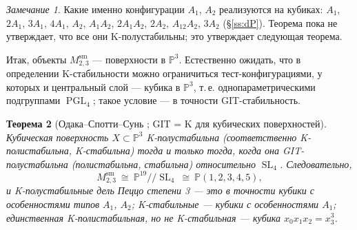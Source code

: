 \documentclass[11pt,a4paper]{article}
\theoremstyle{plain}
\newtheorem{theorem}{Теорема}[section]
\theoremstyle{definition}
\theoremstyle{remark}
\newtheorem{remark}[theorem]{Замечание}
\newcommand{\PP}{\mathbb{P}}
\DeclareMathOperator{\SL}{SL}
\DeclareMathOperator{\PGL}{PGL}
\newcommand{\sm}{\mathrm{sm}}
\begin{document}
\begin{remark}
Какие именно конфигурации $A_1$, $A_2$ реализуются на кубиках: $A_1$, $2A_1$, $3A_1$, $4A_1$,
$A_2$, $A_1A_2$, $2A_1A_2$, $2A_2$, $A_12A_2$, $3A_2$ (\S\ref{ss:dP}). Теорема пока не утверждает, что
все они K-полустабильны; это утверждает следующая теорема.
\end{remark}

Итак, объекты $M^{\sm}_{2,3}$ --- поверхности в $\PP^3$. Естественно ожидать, что в определении
K-стабильности можно ограничиться тест-конфигурациями, у которых и центральный слой --- кубика в
$\PP^3$, т.\,е. однопараметрическими подгруппами $\PGL_4$; такое условие --- в точности GIT-стабильность.

\begin{theorem}[{Одака--Спотти--Сунь \cite{OSS}; GIT = K для кубических поверхностей}]\label{thm:GIT=K}
Кубическая поверхность $X\subset\PP^3$ K-полустабильна \textup{(}соответственно K-полистабильна, K-стабильна\textup{)}
тогда и только тогда, когда она GIT-полустабильна \textup{(}полистабильна, стабильна\textup{)} относительно $\SL_4$.
Следовательно,
\[
M^{\sm}_{2,3}\ \cong\ \PP^{19}/\!/\SL_4\ \cong\ \PP(1,2,3,4,5),
\]
и K-полустабильные дель Пеццо степени 3 --- это в точности кубики с особенностями типов $A_1$, $A_2$;
K-стабильные --- кубики с особенностями $A_1$; единственная K-полистабильная, но не K-стабильная ---
кубика $x_0x_1x_2=x_3^3$.
\end{theorem}
\end{document}
